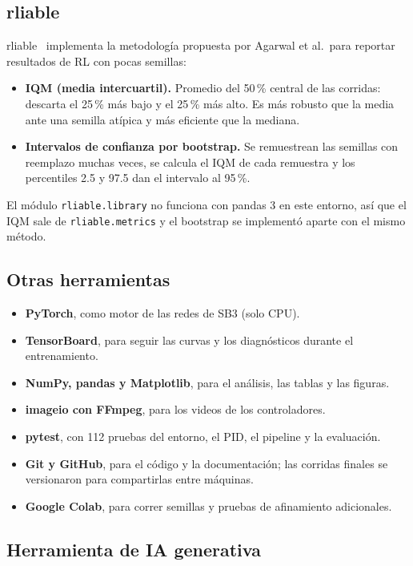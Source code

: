 \documentclass[11pt,a4paper]{article}
\newcommand{\code}[1]{\texttt{#1}}
\begin{document}
\subsection{rliable}

rliable~\cite{agarwal2021} implementa la metodología propuesta por Agarwal et al.\ para reportar resultados de RL con pocas semillas:
\begin{itemize}
  \item \textbf{IQM (media intercuartil).} Promedio del 50\,\% central de las corridas: descarta el 25\,\% más bajo y el 25\,\% más alto. Es más robusto que la media ante una semilla atípica y más eficiente que la mediana.
  \item \textbf{Intervalos de confianza por bootstrap.} Se remuestrean las semillas con reemplazo muchas veces, se calcula el IQM de cada remuestra y los percentiles 2.5 y 97.5 dan el intervalo al 95\,\%.
\end{itemize}
El módulo \code{rliable.library} no funciona con pandas 3 en este entorno, así que el IQM sale de \code{rliable.metrics} y el bootstrap se implementó aparte con el mismo método.

\subsection{Otras herramientas}

\begin{itemize}
  \item \textbf{PyTorch}, como motor de las redes de SB3 (solo CPU).
  \item \textbf{TensorBoard}, para seguir las curvas y los diagnósticos durante el entrenamiento.
  \item \textbf{NumPy, pandas y Matplotlib}, para el análisis, las tablas y las figuras.
  \item \textbf{imageio con FFmpeg}, para los videos de los controladores.
  \item \textbf{pytest}, con 112 pruebas del entorno, el PID, el pipeline y la evaluación.
  \item \textbf{Git y GitHub}, para el código y la documentación; las corridas finales se versionaron para compartirlas entre máquinas.
  \item \textbf{Google Colab}, para correr semillas y pruebas de afinamiento adicionales.
\end{itemize}

\subsection{Herramienta de IA generativa}
\end{document}
